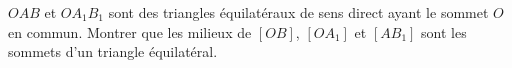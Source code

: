 $OAB$ et $OA_1B_1$ sont des triangles équilatéraux de sens direct ayant le sommet $O$ en commun. Montrer que les milieux de $[OB]$, $[OA_1]$ et $[AB_1]$ sont les sommets d'un triangle équilatéral.
